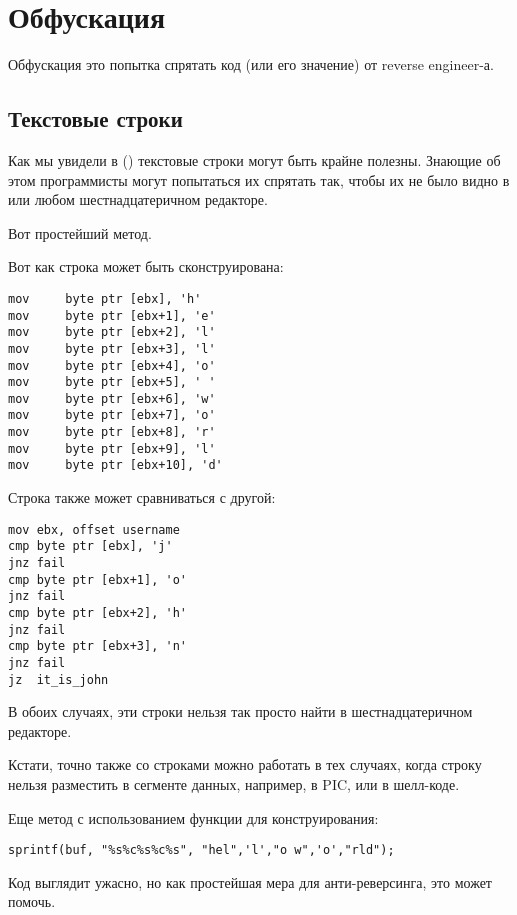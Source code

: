 \section{Обфускация}

Обфускация это попытка спрятать код (или его значение) от reverse engineer-а.

\subsection{Текстовые строки}

Как мы увидели в () текстовые строки могут быть крайне
полезны.
Знающие об этом программисты могут попытаться их спрятать так, чтобы их не было видно в \IDA{} или любом
шестнадцатеричном редакторе.

Вот простейший метод.

Вот как строка может быть сконструирована:

\begin{lstlisting}
mov     byte ptr [ebx], 'h'
mov     byte ptr [ebx+1], 'e'
mov     byte ptr [ebx+2], 'l'
mov     byte ptr [ebx+3], 'l'
mov     byte ptr [ebx+4], 'o'
mov     byte ptr [ebx+5], ' '
mov     byte ptr [ebx+6], 'w'
mov     byte ptr [ebx+7], 'o'
mov     byte ptr [ebx+8], 'r'
mov     byte ptr [ebx+9], 'l'
mov     byte ptr [ebx+10], 'd'
\end{lstlisting}

Строка также может сравниваться с другой:

\begin{lstlisting}
mov	ebx, offset username
cmp	byte ptr [ebx], 'j'
jnz	fail
cmp	byte ptr [ebx+1], 'o'
jnz	fail
cmp	byte ptr [ebx+2], 'h'
jnz	fail
cmp	byte ptr [ebx+3], 'n'
jnz	fail
jz	it_is_john
\end{lstlisting}

В обоих случаях, эти строки нельзя так просто найти в шестнадцатеричном редакторе.

Кстати, точно также со строками можно работать в тех случаях, 
когда строку нельзя разместить в сегменте данных, например, в \ac{PIC}, или в шелл-коде.

Еще метод с использованием функции  для конструирования:

\begin{lstlisting}
sprintf(buf, "%s%c%s%c%s", "hel",'l',"o w",'o',"rld");
\end{lstlisting}

Код выглядит ужасно, но как простейшая мера для анти-реверсинга, это может помочь.

